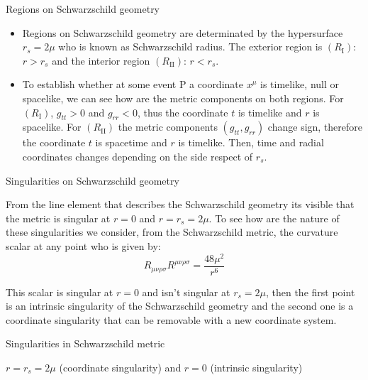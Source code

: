 \documentclass[xcolor=dvipsnames]{beamer}
\begin{document}
\begin{frame}{Regions on Schwarzschild geometry}
\begin{itemize}
\item Regions on Schwarzschild geometry are determinated by the hypersurface $r_s=2\mu$ who is known as Schwarzschild radius. The exterior region is $(R_{\mathrm{I}})$: $r>r_s$ and the interior region $(R_{\mathrm{II}})$: $r<r_s$.\\
\item To establish whether at some event P a
coordinate $x^\mu$ is timelike, null or spacelike, we can see how are the metric components on both regions. For $(R_{\mathrm{I}})$, $g_{tt}>0$ and $g_{rr}<0$,  thus the coordinate $t$ is timelike and $r$ is spacelike. For $(R_{\mathrm{II}})$ the metric components $(g_{tt}, g_{rr})$ change sign, therefore the coordinate $t$ is spacetime and $r$ is timelike. Then, time and radial coordinates changes depending on the side respect of $r_s$.
\end{itemize} 
\end{frame}
\begin{frame}{Singularities on Schwarzschild geometry}
    
From the line element that describes the Schwarzschild geometry its visible that the metric is singular at $r=0$ and $r=r_s=2\mu$.    
To see how are the nature of these singularities we consider, from the Schwarzschild metric, the curvature scalar at any point who is given by:
\begin{equation*}
    R_{\mu\nu\rho\sigma}R^{\mu\nu\rho\sigma}=\frac{48\mu^2}{r^6}
\end{equation*}    
    
This scalar is singular at $r=0$ and isn't singular at $r_s=2\mu$, then the first point is an intrinsic singularity of the Schwarzschild geometry and the second one is a coordinate singularity that can be removable with a new coordinate system.   
    
\begin{block}{Singularities in Schwarzschild metric }
 \begin{center}
 $r=r_s=2\mu$ (coordinate singularity) and  $r=0$ (intrinsic singularity)
\end{center}
\end{block} 
\end{frame}
\end{document}
